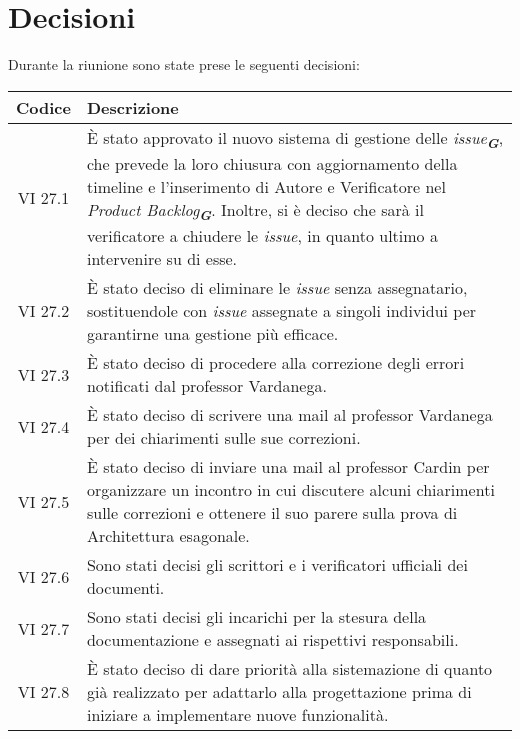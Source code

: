 
\section{Decisioni}

Durante la riunione sono state prese le seguenti decisioni:

\vspace{0.5cm}

\begin{table}[htbp]
    \centering
    \begin{tabular}{|c|p{}|}
        \hline
        \rowcolor[gray]{0.75}
        \textbf{Codice} & \textbf{Descrizione}\\
        \hline
        VI 27.1 & È stato approvato il nuovo sistema di gestione delle \emph{issue}\textsubscript{\textit{\textbf{G}}}, che prevede la loro chiusura con aggiornamento della timeline e l'inserimento di Autore e Verificatore nel \emph{Product Backlog}\textsubscript{\textit{\textbf{G}}}. Inoltre, si è deciso che sarà il verificatore a chiudere le \emph{issue}, in quanto ultimo a intervenire su di esse. \\
        \hline
        VI 27.2 & È stato deciso di eliminare le \emph{issue} senza assegnatario, sostituendole con \emph{issue} assegnate a singoli individui per garantirne una gestione più efficace. \\
        \hline
        VI 27.3 & È stato deciso di procedere alla correzione degli errori notificati dal professor Vardanega. \\
        \hline
        VI 27.4 & È stato deciso di scrivere una mail al professor Vardanega per dei chiarimenti sulle sue correzioni. \\
        \hline
        VI 27.5 & È stato deciso di inviare una mail al professor Cardin per organizzare un incontro in cui discutere alcuni chiarimenti sulle correzioni e ottenere il suo parere sulla prova di Architettura esagonale. \\
        \hline
        VI 27.6 & Sono stati decisi gli scrittori e i verificatori ufficiali dei documenti. \\
        \hline
        VI 27.7 & Sono stati decisi gli incarichi per la stesura della documentazione e assegnati ai rispettivi responsabili. \\
        \hline
        VI 27.8 & È stato deciso di dare priorità alla sistemazione di quanto già realizzato per adattarlo alla progettazione prima di iniziare a implementare nuove funzionalità. \\

\end{tabular}
\end{table}
